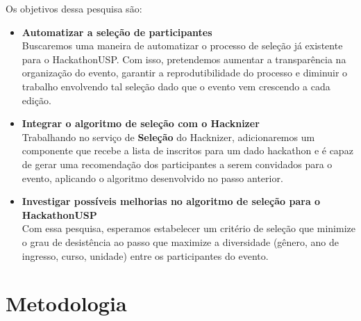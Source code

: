 \documentclass[10pt,twoside,a4paper]{article}
\begin{document}
    Os objetivos dessa pesquisa são:
    \begin{itemize}
        \item \textbf{Automatizar a seleção de participantes}\\
          Buscaremos uma maneira de automatizar o processo de seleção já existente para o HackathonUSP. Com isso, pretendemos aumentar a transparência na organização do evento, garantir a reprodutibilidade do processo e diminuir o trabalho envolvendo tal seleção dado que o evento vem crescendo a cada edição.
        
        \item \textbf{Integrar o algoritmo de seleção com o Hacknizer}\\
          Trabalhando no serviço de \textbf{Seleção} do Hacknizer, adicionaremos um componente que recebe a lista de inscritos para um dado hackathon e é capaz de gerar uma recomendação dos participantes a serem convidados para o evento, aplicando o algoritmo desenvolvido no passo anterior.
        
        \item \textbf{Investigar possíveis melhorias no algoritmo de seleção para o HackathonUSP}\\
          Com essa pesquisa, esperamos estabelecer um critério de seleção que minimize o grau de desistência ao passo que maximize a diversidade (gênero, ano de ingresso, curso, unidade) entre os participantes do evento.
    \end{itemize}
    
\section{Metodologia}
      
\end{document}
